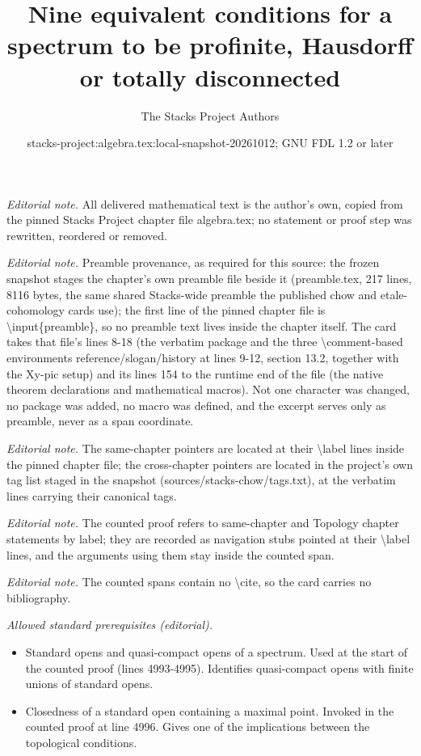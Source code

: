 \documentclass[10pt,a4paper]{amsart}
\title{Nine equivalent conditions for a spectrum to be profinite, Hausdorff or totally disconnected}
\author{The Stacks Project Authors}
\date{stacks-project:algebra.tex:local-snapshot-20261012; GNU FDL 1.2 or later}
\theoremstyle{plain}
\theoremstyle{definition}
\theoremstyle{remark}
\numberwithin{equation}{subsection}
\begin{document}
\maketitle
\noindent\textit{Editorial note.} All delivered mathematical text is the author's own, copied from the pinned Stacks Project chapter file algebra.tex; no statement or proof step was rewritten, reordered or removed.\par\medskip
\noindent\textit{Editorial note.} Preamble provenance, as required for this source: the frozen snapshot stages the chapter's own preamble file beside it (preamble.tex, 217 lines, 8116 bytes, the same shared Stacks-wide preamble the published chow and etale-cohomology cards use); the first line of the pinned chapter file is \textbackslash{}input\{preamble\}, so no preamble text lives inside the chapter itself. The card takes that file's lines 8-18 (the verbatim package and the three \textbackslash{}comment-based environments reference/slogan/history at lines 9-12, section 13.2, together with the Xy-pic setup) and its lines 154 to the runtime end of the file (the native theorem declarations and mathematical macros). Not one character was changed, no package was added, no macro was defined, and the excerpt serves only as preamble, never as a span coordinate.\par\medskip
\noindent\textit{Editorial note.} The same-chapter pointers are located at their \textbackslash{}label lines inside the pinned chapter file; the cross-chapter pointers are located in the project's own tag list staged in the snapshot (sources/stacks-chow/tags.txt), at the verbatim lines carrying their canonical tags.\par\medskip
\noindent\textit{Editorial note.} The counted proof refers to same-chapter and Topology chapter statements by label; they are recorded as navigation stubs pointed at their \textbackslash{}label lines, and the arguments using them stay inside the counted span.\par\medskip
\noindent\textit{Editorial note.} The counted spans contain no \textbackslash{}cite, so the card carries no bibliography.\par\medskip
\noindent\textit{Allowed standard prerequisites (editorial).}\begin{itemize}
\item Standard opens and quasi-compact opens of a spectrum. Used at the start of the counted proof (lines 4993-4995). Identifies quasi-compact opens with finite unions of standard opens.
\item Closedness of a standard open containing a maximal point. Invoked in the counted proof at line 4996. Gives one of the implications between the topological conditions.
\end{itemize}\medskip
\end{document}
